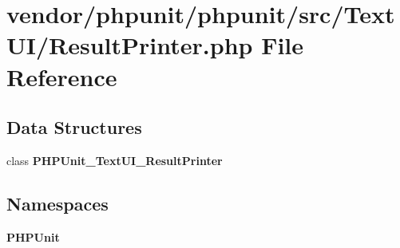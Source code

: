 \section{vendor/phpunit/phpunit/src/\+Text\+U\+I/\+Result\+Printer.php File Reference}
\label{_text_u_i_2_result_printer_8php}
\subsection*{Data Structures}
\begin{DoxyCompactItemize}
\item 
class {\bf P\+H\+P\+Unit\+\_\+\+Text\+U\+I\+\_\+\+Result\+Printer}
\end{DoxyCompactItemize}
\subsection*{Namespaces}
\begin{DoxyCompactItemize}
\item 
 {\bf P\+H\+P\+Unit}
\end{DoxyCompactItemize}
